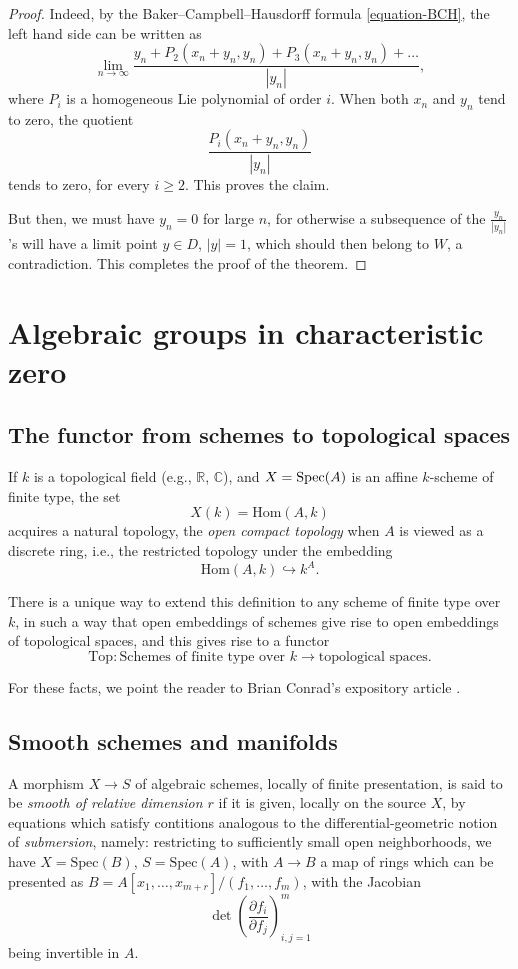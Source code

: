 \begin{proof}
Indeed, by the Baker--Campbell--Hausdorff formula \eqref{equation-BCH}, the left hand side can be written as
$$\lim_{n\to \infty} \frac{y_n + P_2(x_n+y_n,y_n) + P_3 (x_n+y_n,y_n) + \dots}{|y_n|},$$
where $P_i$ is a homogeneous Lie polynomial of order $i$. When both $x_n$ and $y_n$ tend to zero, the quotient 
$$ \frac{P_i(x_n+y_n,y_n)}{|y_n|}$$
tends to zero, for every $i\ge 2$. This proves the claim.

But then, we must have $y_n=0$ for large $n$, for otherwise a subsequence of the $\frac{y_n}{|y_n|}$'s will have a limit point $y\in D$, $|y|=1$, which should then belong to $W$, a contradiction. This completes the proof of the theorem.

\end{proof}

\section{Algebraic groups in characteristic zero}
\label{section-algebraic-groups}

\subsection{The functor from schemes to topological spaces}
\label{subsection-schemes-to-top}

If $k$ is a topological field (e.g., $\mathbb R$, $\mathbb C$), and $X = \mathop{\rm Spec}(A)$ is an affine $k$-scheme of finite type, the set 
$$ X(k) = \text{Hom}(A,k)$$
acquires a natural topology, the \emph{open compact topology} when $A$ is viewed as a discrete ring, i.e., the restricted topology under the embedding
$$ \text{Hom}(A,k) \hookrightarrow k^A.$$

There is a unique way to extend this definition to any scheme of finite type over $k$, in such a way that open embeddings of schemes give rise to open embeddings of topological spaces, and this gives rise to a functor 
$$ \text{Top}: \text{Schemes of finite type over }k \to \text{topological spaces}.$$

For these facts, we point the reader to Brian Conrad's expository article \cite{Conrad-Weil}.

\subsection{Smooth schemes and manifolds}
\label{subsection-smoothschemes-to-manifolds}

A morphism $X\to S$ of algebraic schemes, locally of finite presentation, is said to be \emph{smooth of relative dimension $r$} if it is given, locally on the source $X$, by equations which satisfy contitions analogous to the differential-geometric notion of \emph{submersion}, namely: restricting to sufficiently small open neighborhoods, we have $X=\text{Spec}(B)$, $S=\text{Spec}(A)$, with $A\to B$ a map of rings which can be presented as $B=A[x_1, \dots, x_{m+r}]/(f_1, \dots, f_m)$, with the Jacobian
$$ \det \left( \frac{\partial f_i}{\partial f_j} \right)_{i, j=1}^m $$
being invertible in $A$. 


